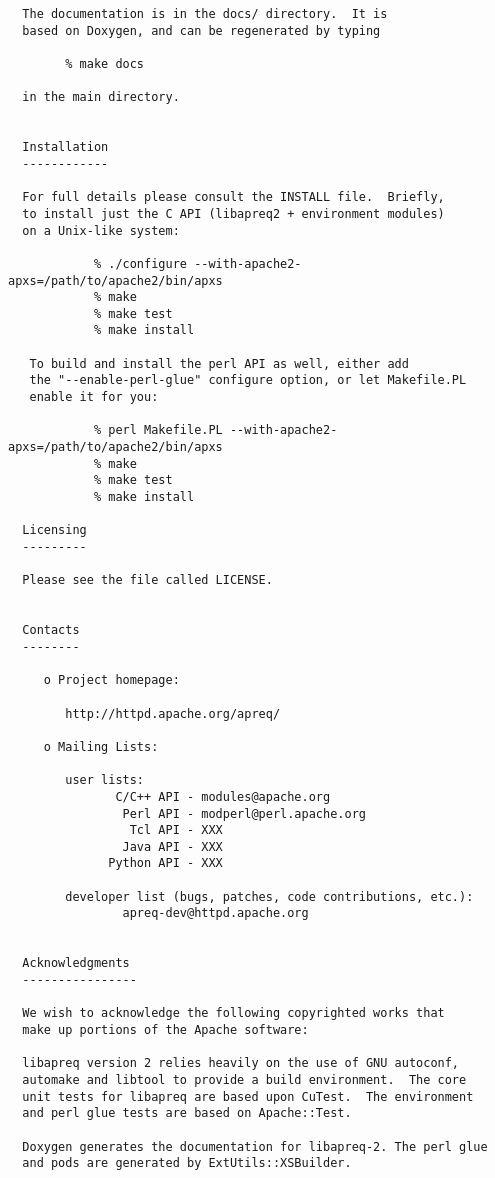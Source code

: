 \begin{verbatim}
  The documentation is in the docs/ directory.  It is
  based on Doxygen, and can be regenerated by typing

        % make docs

  in the main directory.


  Installation
  ------------

  For full details please consult the INSTALL file.  Briefly,
  to install just the C API (libapreq2 + environment modules)
  on a Unix-like system:

            % ./configure --with-apache2-apxs=/path/to/apache2/bin/apxs
            % make
            % make test
            % make install

   To build and install the perl API as well, either add
   the "--enable-perl-glue" configure option, or let Makefile.PL
   enable it for you:

            % perl Makefile.PL --with-apache2-apxs=/path/to/apache2/bin/apxs
            % make
            % make test 
            % make install

  Licensing
  ---------

  Please see the file called LICENSE.


  Contacts
  --------

     o Project homepage:

        http://httpd.apache.org/apreq/

     o Mailing Lists:

        user lists:
               C/C++ API - modules@apache.org
                Perl API - modperl@perl.apache.org
                 Tcl API - XXX
                Java API - XXX
              Python API - XXX

        developer list (bugs, patches, code contributions, etc.):
                apreq-dev@httpd.apache.org


  Acknowledgments
  ----------------

  We wish to acknowledge the following copyrighted works that
  make up portions of the Apache software:

  libapreq version 2 relies heavily on the use of GNU autoconf, 
  automake and libtool to provide a build environment.  The core
  unit tests for libapreq are based upon CuTest.  The environment
  and perl glue tests are based on Apache::Test.  

  Doxygen generates the documentation for libapreq-2. The perl glue
  and pods are generated by ExtUtils::XSBuilder.
\end{verbatim}\normalsize

